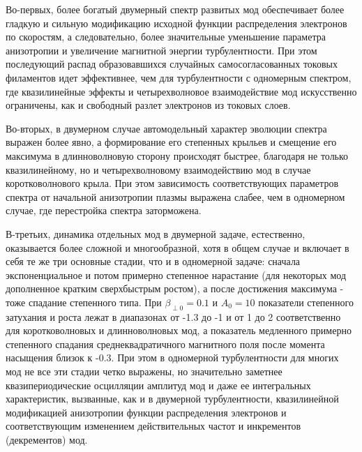 Во-первых, более богатый двумерный спектр развитых мод обеспечивает более гладкую и сильную модификацию исходной функции распределения электронов по скоростям, а следовательно, более значительные уменьшение параметра анизотропии и увеличение магнитной энергии турбулентности. При этом последующий распад образовавшихся случайных самосогласованных токовых филаментов идет эффективнее, чем для турбулентности с одномерным спектром, где квазилинейные эффекты и четырехволновое взаимодействие мод искусственно ограничены, как и свободный разлет электронов из токовых слоев.

Во-вторых, в двумерном случае автомодельный характер эволюции спектра выражен более явно, а формирование его степенных крыльев и смещение его максимума в длинноволновую сторону происходят быстрее, благодаря не только квазилинейному, но и четырехволновому взаимодействию мод в случае коротковолнового крыла. При этом зависимость соответствующих параметров спектра от начальной анизотропии плазмы выражена слабее, чем в одномерном случае, где перестройка спектра заторможена.

В-третьих, динамика отдельных мод в двумерной задаче, естественно, оказывается более сложной и многообразной, хотя в общем случае и включает в себя те же три основные стадии, что и в одномерной задаче: сначала экспоненциальное и потом примерно степенное нарастание (для некоторых мод дополненное кратким сверхбыстрым ростом), а после достижения максимума - тоже спадание степенного типа. При $\beta_{\perp0}=0.1$ и $A_{0}=10$ показатели степенного затухания и роста лежат в диапазонах от -1.3 до -1 и от 1 до 2 соответственно для коротковолновых и длинноволновых мод, а показатель медленного примерно степенного спадания среднеквадратичного магнитного поля после момента насыщения близок к -0.3. 
При этом в одномерной турбулентности для многих мод не все эти стадии четко выражены, но значительно заметнее квазипериодические осцилляции амплитуд мод и даже ее интегральных характеристик, вызванные, как и в двумерной турбулентности, квазилинейной модификацией анизотропии функции распределения электронов и соответствующим изменением действительных частот и инкрементов (декрементов) мод.